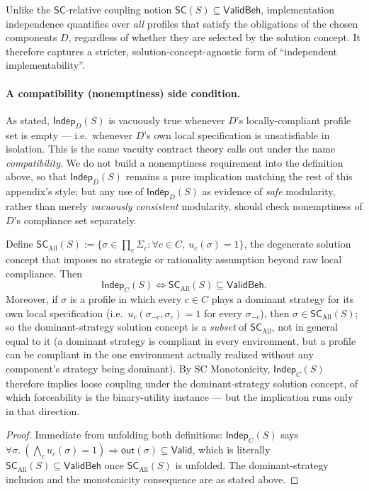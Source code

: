 Unlike the $\mathsf{SC}$-relative coupling notion
$\mathsf{SC}(S) \subseteq \mathsf{ValidBeh}$, implementation independence
quantifies over \emph{all} profiles that satisfy the obligations of the
chosen components $D$, regardless of whether they are selected by the
solution concept.
It therefore captures a stricter, solution-concept-agnostic form of
``independent implementability''.

\paragraph{A compatibility (nonemptiness) side condition.}
As stated, $\mathsf{Indep}_D(S)$ is vacuously true whenever $D$'s
locally-compliant profile set is empty --- i.e.\ whenever $D$'s own local
specification is unsatisfiable in isolation. This is the same vacuity
contract theory calls out under the name \emph{compatibility}. We do not
build a nonemptiness requirement into the definition above, so that
$\mathsf{Indep}_D(S)$ remains a pure implication matching the rest of this
appendix's style; but any use of $\mathsf{Indep}_D(S)$ as evidence of
\emph{safe} modularity, rather than merely \emph{vacuously consistent}
modularity, should check nonemptiness of $D$'s compliance set separately.

\begin{proposition}
\label{prop:indep-is-sc-all}
Define $\mathsf{SC}_{\mathrm{All}}(S) := \{\sigma \in \prod_c \Sigma_c :
\forall c\in C,\ u_c(\sigma)=1\}$, the degenerate solution concept that
imposes no strategic or rationality assumption beyond raw local compliance.
Then
\[
\mathsf{Indep}_C(S) \iff \mathsf{SC}_{\mathrm{All}}(S) \subseteq \mathsf{ValidBeh}.
\]
Moreover, if $\sigma$ is a profile in which every $c\in C$ plays a dominant
strategy for its own local specification (i.e.\ $u_c(\sigma_{-c},\sigma_c)=1$
for every $\sigma_{-c}$), then $\sigma\in\mathsf{SC}_{\mathrm{All}}(S)$; so
the dominant-strategy solution concept is a \emph{subset} of
$\mathsf{SC}_{\mathrm{All}}$, not in general equal to it (a dominant strategy
is compliant in every environment, but a profile can be compliant in the one
environment actually realized without any component's strategy being
dominant). By SC Monotonicity, $\mathsf{Indep}_C(S)$ therefore implies loose
coupling under the dominant-strategy solution concept, of which forceability
is the binary-utility instance --- but the implication runs only in that
direction.
\end{proposition}
\begin{proof}
Immediate from unfolding both definitions: $\mathsf{Indep}_C(S)$ says
$\forall\sigma.\ (\bigwedge_c u_c(\sigma)=1) \Rightarrow
\mathsf{out}(\sigma)\subseteq\mathsf{Valid}$, which is literally
$\mathsf{SC}_{\mathrm{All}}(S)\subseteq\mathsf{ValidBeh}$ once
$\mathsf{SC}_{\mathrm{All}}(S)$ is unfolded. The dominant-strategy inclusion
and the monotonicity consequence are as stated above.
\end{proof}

